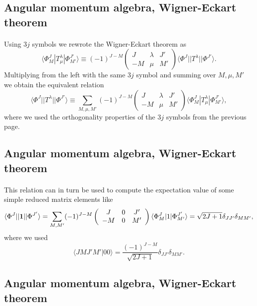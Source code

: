 \documentclass[%
twoside,                 %
final,                   %
10pt]{article}
\begin{document}
\subsection*{Angular momentum algebra, Wigner-Eckart theorem}

\paragraph{}
Using $3j$ symbols we rewrote the Wigner-Eckart theorem as
\[
\langle \Phi^J_M|T^{\lambda}_{\mu}|\Phi^{J'}_{M'}\rangle\equiv(-1)^{J-M}\left(\begin{array}{ccc}  J & \lambda & J' \\ -M & \mu & M'\end{array}\right)\langle \Phi^J||T^{\lambda}||\Phi^{J'}\rangle.
\]
Multiplying from the left with the same $3j$ symbol and summing over $M,\mu,M'$ we obtain the equivalent relation 
\[
\langle \Phi^J||T^{\lambda}||\Phi^{J'}\rangle\equiv\sum_{M,\mu,M'}(-1)^{J-M}\left(\begin{array}{ccc}  J & \lambda & J' \\ -M & \mu & M'\end{array}\right)\langle \Phi^J_M|T^{\lambda}_{\mu}|\Phi^{J'}_{M'}\rangle,
\]
where we used the orthogonality properties of the $3j$ symbols from the previous page.


\subsection*{Angular momentum algebra, Wigner-Eckart theorem}

\paragraph{}
This relation can in turn be used to compute the expectation value of some simple reduced matrix elements like
\[
\langle \Phi^J||{\bf 1}||\Phi^{J'}\rangle=\sum_{M,M'}(-1)^{J-M}\left(\begin{array}{ccc}  J & 0 & J' \\ -M & 0 & M'\end{array}\right)\langle \Phi^J_M|1|\Phi^{J'}_{M'}\rangle=\sqrt{2J+1}\delta_{JJ'}\delta_{MM'},
\]
where we used
\[
\langle JM J'M' |00\rangle =\frac{(-1)^{J-M}}{\sqrt{2J+1}}\delta_{JJ'}\delta_{MM'}.
\]


\subsection*{Angular momentum algebra, Wigner-Eckart theorem}
\end{document}
